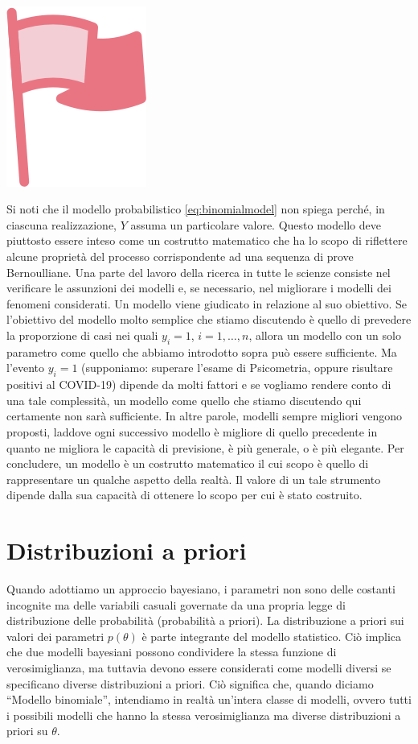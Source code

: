 \documentclass[
  10pt,
  italian,
  a4paper,
  extrafontsizes,onecolumn,openright
  ]{memoir}
\newenvironment{mdframedwithfootImportant}
{   
    \savenotes
    \begin{mdframed}[%
    topline=true, bottomline=true, linecolor=oiR, linewidth=0.5pt,
    rightline=false, leftline=false,
    backgroundcolor=oiLGray]
    \renewcommand{\thempfootnote}{\arabic{footnote}}
    }
{
    \end{mdframed}
    \spewnotes
}
\newenvironment{important}{
    \let\oldtextbf\textbf
    \renewcommand{\textbf}[1]{{\textcolor{oiR}{\oldtextbf{##1}}}}
\vspace{4mm}
\begin{mdframedwithfootImportant}
\begin{minipage}[t]{0.10\textwidth}
{$\:$ \\ \setkeys{Gin}{width=2.5em,keepaspectratio}\includegraphics{images/_icons/important.png}}
\end{minipage}
\hfill
\begin{minipage}[t]{0.90\textwidth}
\vspace{-2mm}
\setlength{\parskip}{1em}
}{\end{minipage}
\end{mdframedwithfootImportant}
\vspace{4mm}
}
\theoremstyle{definition}
\theoremstyle{definition}
\theoremstyle{definition}
\theoremstyle{definition}
\theoremstyle{remark}
\begin{document}
\begin{important}
Si noti che il modello probabilistico \eqref{eq:binomialmodel} non spiega perché, in ciascuna realizzazione, \(Y\) assuma un particolare valore. Questo modello deve piuttosto essere inteso come un costrutto matematico che ha lo scopo di riflettere alcune proprietà del processo corrispondente ad una sequenza di prove Bernoulliane. Una parte del lavoro della ricerca in tutte le scienze consiste nel verificare le assunzioni dei modelli e, se necessario, nel migliorare i modelli dei fenomeni considerati. Un modello viene giudicato in relazione al suo obiettivo. Se l'obiettivo del modello molto semplice che stiamo discutendo è quello di prevedere la proporzione di casi nei quali \(y_i = 1\), \(i = 1, \dots, n\), allora un modello con un solo parametro come quello che abbiamo introdotto sopra può essere sufficiente. Ma l'evento \(y_i=1\) (supponiamo: superare l'esame di Psicometria, oppure risultare positivi al COVID-19) dipende da molti fattori e se vogliamo rendere conto di una tale complessità, un modello come quello che stiamo discutendo qui certamente non sarà sufficiente. In altre parole, modelli sempre migliori vengono proposti, laddove ogni successivo modello è migliore di quello precedente in quanto ne migliora le capacità di previsione, è più generale, o è più elegante. Per concludere, un modello è un costrutto matematico il cui scopo è quello di rappresentare un qualche aspetto della realtà. Il valore di un tale strumento dipende dalla sua capacità di ottenere lo scopo per cui è stato costruito.

\end{important}

\hypertarget{distribuzioni-a-priori}{%
\section{Distribuzioni a priori}\label{distribuzioni-a-priori}}

Quando adottiamo un approccio bayesiano, i parametri non sono delle costanti incognite ma delle variabili casuali governate da una propria legge di distribuzione delle probabilità (probabilità a priori). La distribuzione a priori sui valori dei parametri \(p(\theta)\) è parte integrante del modello statistico. Ciò implica che due modelli bayesiani possono condividere la stessa funzione di verosimiglianza, ma tuttavia devono essere considerati come modelli diversi se specificano diverse distribuzioni a priori. Ciò significa che, quando diciamo ``Modello binomiale'', intendiamo in realtà un'intera classe di modelli, ovvero tutti i possibili modelli che hanno la stessa verosimiglianza ma diverse distribuzioni a priori su \(\theta\).
\end{document}
